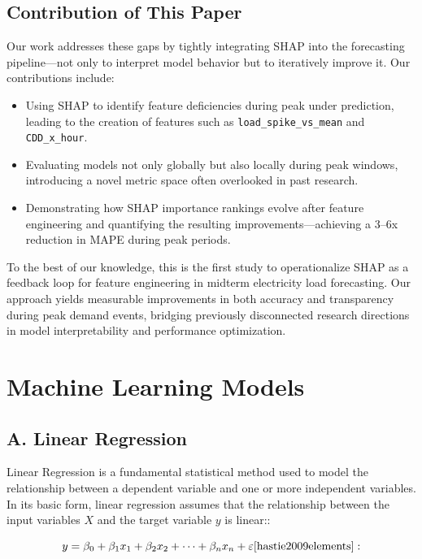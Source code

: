 \documentclass[final,numbered]{ifacconf}
\begin{document}
\subsection{Contribution of This Paper}

Our work addresses these gaps by tightly integrating SHAP into the forecasting pipeline—not only to interpret model behavior but to iteratively improve it. Our contributions include:

\begin{itemize}
    \item Using SHAP to identify feature deficiencies during peak under prediction, leading to the creation of features such as \texttt{load\_spike\_vs\_mean} and \texttt{CDD\_x\_hour}.
    \item Evaluating models not only globally but also locally during peak windows, introducing a novel metric space often overlooked in past research.
    \item Demonstrating how SHAP importance rankings evolve after feature engineering and quantifying the resulting improvements—achieving a 3–6x reduction in MAPE during peak periods.
\end{itemize}

To the best of our knowledge, this is the first study to operationalize SHAP as a feedback loop for feature engineering in midterm electricity load forecasting. Our approach yields measurable improvements in both accuracy and transparency during peak demand events, bridging previously disconnected research directions in model interpretability and performance optimization.



\section{Machine Learning Models}
\subsection{A. Linear Regression}
Linear Regression is a fundamental statistical method used to model the relationship between a dependent variable and one or more independent variables. In its basic form, linear regression assumes that the relationship between the input variables $X$ and the target variable $y$ is linear:\cite{hastie2009elements}:

\begin{equation}
y = \beta_0 + \beta_1 x_1 + \beta_2 x_2 + \dots + \beta_n x_n + \varepsilon
\label{eq:linear_regression}
\cite{hastie2009elements}:
\end{equation}
\end{document}
